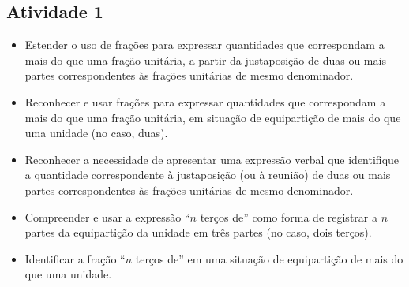 \documentclass[oneside]{book}
\begin{document}
\begin{multicols}{2}


\subsection{Atividade 1}

   \vspace{.1cm}

  \begin{itemize} %
    \item       Estender o uso de frações para expressar quantidades que correspondam a mais do que uma fração unitária, a partir da justaposição de duas ou mais partes correspondentes às frações unitárias de mesmo denominador.
    \item       Reconhecer e usar frações para expressar quantidades que correspondam a mais do que uma fração unitária, em situação de equipartição de mais do que uma unidade (no caso, duas).
    \item       Reconhecer a necessidade de apresentar uma expressão verbal que identifique a quantidade correspondente à justaposição (ou à reunião) de duas ou mais partes correspondentes às frações unitárias de mesmo denominador.
    \item       Compreender e usar a expressão       ``$n$ terços de''       como forma de registrar a       $n$       partes da equipartição da unidade em três partes (no caso, dois terços).
    \item       Identificar a fração       ``$n$ terços de''       em uma situação de equipartição de mais do que uma unidade.
\end{itemize} %


  \vspace{.1cm} 
  
  \vspace{.1cm}
  

\end{multicols}
\end{document}
